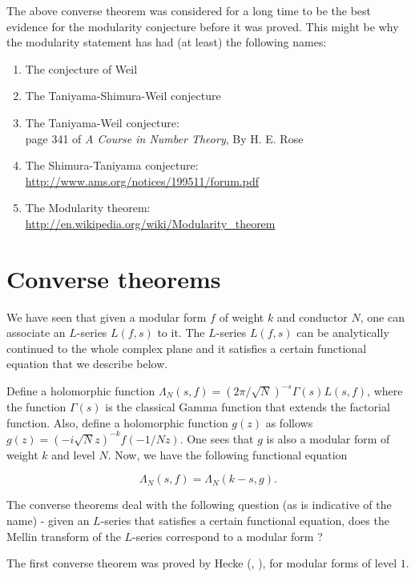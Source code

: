 \documentclass{book}
\begin{document}
The above converse theorem was considered for a long time to be
the best evidence for the modularity conjecture before
it was proved.  This might be why the modularity statement
has had (at least) the following names:
\begin{enumerate}
\item The conjecture of Weil
\item The Taniyama-Shimura-Weil conjecture
\item The Taniyama-Weil conjecture:\\ page 341 of {\em A Course in Number Theory}, By H. E. Rose
\item The Shimura-Taniyama conjecture:\\ \url{http://www.ams.org/notices/199511/forum.pdf}
\item The Modularity theorem:\\ \url{http://en.wikipedia.org/wiki/Modularity_theorem}
\end{enumerate}

\section{Converse theorems}

We have seen that given a modular form $f$ of weight $k$ and conductor $N$, one can associate an $L$-series $L(f,s)$ to it. The $L$-series $L(f,s)$ can be analytically continued to the whole complex plane and it satisfies a certain functional equation that we describe below.

Define a holomorphic function $\Lambda_N(s,f)= (2\pi/\sqrt{N})^{-s} \Gamma(s) L(s,f)$, where the function $\Gamma(s)$ is the classical Gamma function that extends the factorial function. Also, define a holomorphic function $g(z)$ as follows $g(z)=(-i \sqrt{N} z)^{-k} f(-1/Nz)$. One sees that $g$ is also a modular form of weight $k$ and level $N$. Now, we have the following functional equation

\begin{equation}
\Lambda_N(s,f) = \Lambda_N(k-s,g).
\end{equation}

The converse theorems deal with the following question (as is indicative of the name) - given an $L$-series that satisfies a certain functional equation, does the Mellin transform of the $L$-series correspond to a modular form ?

The first converse theorem was proved by Hecke (\cite{hecke1936bestimmung}, \cite{hecke1959mathematische}), for modular forms of level $1$.
\end{document}
